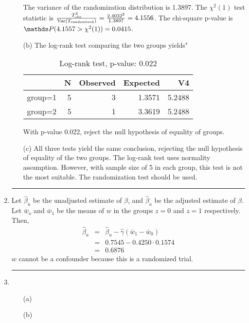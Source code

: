 \documentclass[11pt,a4paper]{article}
\begin{document}
\begin{enumerate}
\begin{enumerate}
The variance of the randomization distribution is 1.3897. The $\chi^2(1)$ test statistic is $\frac{T^2_{\text{obs}}}{\operatorname{Var}(T_{\text{randomized}})} = \frac{2.4032^2}{1.3897} = 4.1556$. The chi-square p-value is $\Prob(4.1557 > \chi^2(1)) = 0.0415$.  

\item[(b)] The log-rank test comparing the two groups yields"
\begin{table}[H]
\centering
\begin{tabular}{rrrrr}
  \hline
 & N & Observed & Expected & V4 \\ 
  \hline
group=1 & 5 & 3 & 1.3571 & 5.2488 \\ 
  group=2 & 5 & 1 & 3.3619 & 5.2488 \\ 
   \hline
\end{tabular}
\caption{Log-rank test, p-value: 0.022}
\end{table}
With p-value 0.022, reject the null hypothesis of equality of groups. 
\item[(c)] All three tests yield the same conclusion, rejecting the null hypothesis of equality of the two groups. The log-rank test uses normality assumption. However, with sample size of 5 in each group, this test is not the most suitable. The randomization test should be used.
\end{enumerate}

\rule{\textwidth}{1pt}
\vspace{1in}
\item
Let $\hat{\beta}_u$ be the unadjusted estimate of $\beta$, and $\hat{\beta}_a$ be the adjusted estimate of $\beta$. Let $\bar{w}_o$ and $\bar{w}_1$ be the means of $w$ in the groups $z = 0$ and $z = 1$ respectively. Then,
\begin{eqnarray*}
\hat{\beta}_a & = & \hat{\beta}_u - \hat{\gamma}(\bar{w}_1 - \bar{w}_0) \\
              & = & 0.7545 - 0.4250 \cdot 0.1574 \\
              & = & 0.6876
\end{eqnarray*}
$w$ cannot be a confounder because this is a randomized trial.

\rule{\textwidth}{1pt}
\vspace{1in}
\item
\begin{enumerate}
\item[(a)] 
\item[(b)] 
\end{enumerate}


\end{enumerate}
\end{document}
